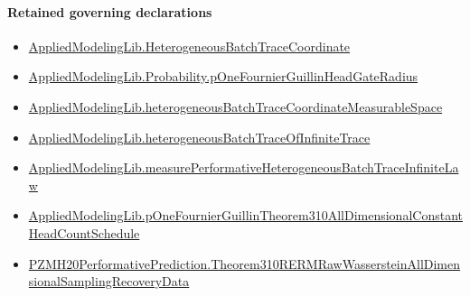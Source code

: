 \documentclass[10pt]{article}
\begin{document}
\paragraph{Retained governing declarations}
\begin{itemize}\raggedright
\item \hyperlink{governing-declaration-37d7ae049de215a7}{Applied\allowbreak{}Modeling\allowbreak{}Lib.\allowbreak{}Heterogeneous\allowbreak{}Batch\allowbreak{}Trace\allowbreak{}Coordinate}
\item \hyperlink{governing-declaration-c6ed5828a32d7abc}{Applied\allowbreak{}Modeling\allowbreak{}Lib.\allowbreak{}Probability.\allowbreak{}p\allowbreak{}One\allowbreak{}Fournier\allowbreak{}Guillin\allowbreak{}Head\allowbreak{}Gate\allowbreak{}Radius}
\item \hyperlink{governing-declaration-92d1582063c434f3}{Applied\allowbreak{}Modeling\allowbreak{}Lib.\allowbreak{}heterogeneous\allowbreak{}Batch\allowbreak{}Trace\allowbreak{}Coordinate\allowbreak{}Measurable\allowbreak{}Space}
\item \hyperlink{governing-declaration-644c195e65179f85}{Applied\allowbreak{}Modeling\allowbreak{}Lib.\allowbreak{}heterogeneous\allowbreak{}Batch\allowbreak{}Trace\allowbreak{}Of\allowbreak{}Infinite\allowbreak{}Trace}
\item \hyperlink{governing-declaration-2833c0091dd3eed5}{Applied\allowbreak{}Modeling\allowbreak{}Lib.\allowbreak{}measure\allowbreak{}Performative\allowbreak{}Heterogeneous\allowbreak{}Batch\allowbreak{}Trace\allowbreak{}Infinite\allowbreak{}Law}
\item \hyperlink{governing-declaration-2269f56f83ce7a1c}{Applied\allowbreak{}Modeling\allowbreak{}Lib.\allowbreak{}p\allowbreak{}One\allowbreak{}Fournier\allowbreak{}Guillin\allowbreak{}Theorem310\allowbreak{}All\allowbreak{}Dimensional\allowbreak{}Constant\allowbreak{}Head\allowbreak{}Count\allowbreak{}Schedule}
\item \hyperlink{paper-prerequisite-c4f8b85515c18d59}{PZMH20\allowbreak{}Performative\allowbreak{}Prediction.\allowbreak{}Theorem310\allowbreak{}RERM\allowbreak{}Raw\allowbreak{}Wasserstein\allowbreak{}All\allowbreak{}Dimensional\allowbreak{}Sampling\allowbreak{}Recovery\allowbreak{}Data}
\end{itemize}
\end{document}
